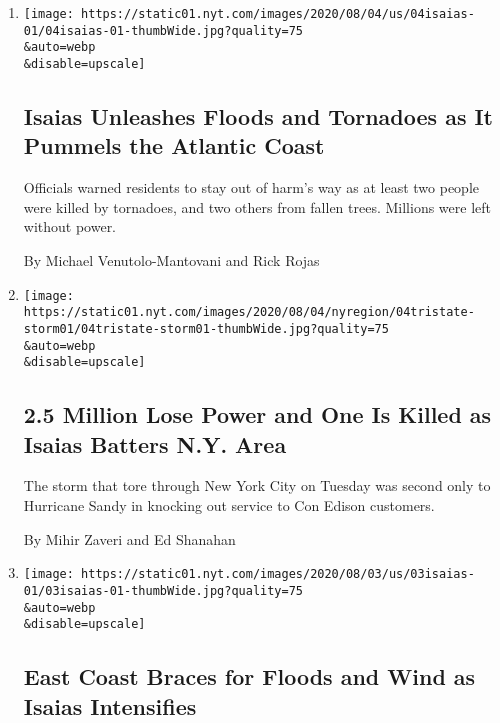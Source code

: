 \begin{enumerate}
\def\labelenumi{\arabic{enumi}.}
\item
  \href{/2020/08/04/us/hurricane-isaias-updates.html}{}

  \texttt{[image: https://static01.nyt.com/images/2020/08/04/us/04isaias-01/04isaias-01-thumbWide.jpg?quality=75\\\&auto=webp\\\&disable=upscale]}

  \hypertarget{isaias-unleashes-floods-and-tornadoes-as-it-pummels-the-atlantic-coast}{%
  \subsection{Isaias Unleashes Floods and Tornadoes as It Pummels the
  Atlantic
  Coast}\label{isaias-unleashes-floods-and-tornadoes-as-it-pummels-the-atlantic-coast}}

  Officials warned residents to stay out of harm's way as at least two
  people were killed by tornadoes, and two others from fallen trees.
  Millions were left without power.

  By Michael Venutolo-Mantovani and Rick Rojas
\item
  \href{/2020/08/04/nyregion/isaias-ny.html}{}

  \texttt{[image: https://static01.nyt.com/images/2020/08/04/nyregion/04tristate-storm01/04tristate-storm01-thumbWide.jpg?quality=75\\\&auto=webp\\\&disable=upscale]}

  \hypertarget{25-million-lose-power-and-one-is-killed-as-isaias-batters-ny-area}{%
  \subsection{2.5 Million Lose Power and One Is Killed as Isaias Batters
  N.Y.
  Area}\label{25-million-lose-power-and-one-is-killed-as-isaias-batters-ny-area}}

  The storm that tore through New York City on Tuesday was second only
  to Hurricane Sandy in knocking out service to Con Edison customers.

  By Mihir Zaveri and Ed Shanahan
\item
  \href{/2020/08/03/us/isaias-east-coast-landfall.html}{}

  \texttt{[image: https://static01.nyt.com/images/2020/08/03/us/03isaias-01/03isaias-01-thumbWide.jpg?quality=75\\\&auto=webp\\\&disable=upscale]}

  \hypertarget{east-coast-braces-for-floods-and-wind-as-isaias-intensifies}{%
  \subsection{East Coast Braces for Floods and Wind as Isaias
  Intensifies}\label{east-coast-braces-for-floods-and-wind-as-isaias-intensifies}}


\end{enumerate}
